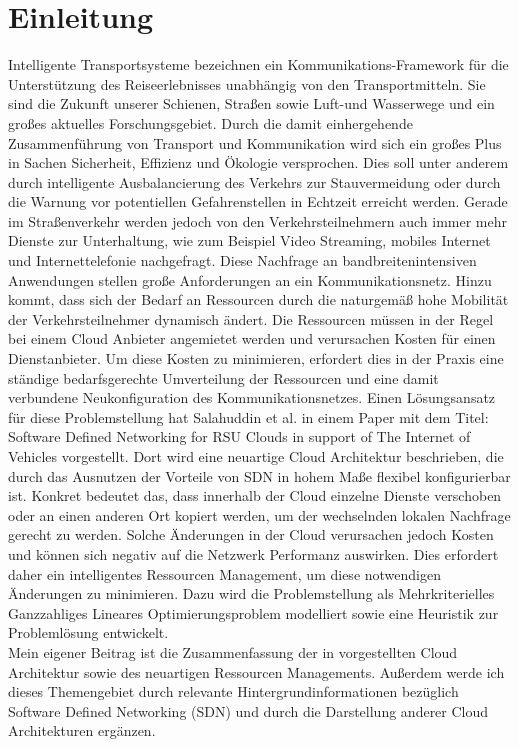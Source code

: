 \documentclass[conference]{IEEEtran}
\begin{document}
\section{Einleitung}

Intelligente Transportsysteme bezeichnen ein Kommunikations-Framework für die Unterstützung des Reiseerlebnisses unabhängig von den Transportmitteln. Sie sind die Zukunft unserer Schienen, Straßen sowie Luft-und Wasserwege und ein großes aktuelles Forschungsgebiet. Durch die damit einhergehende Zusammenführung von Transport und Kommunikation wird sich ein großes Plus in Sachen Sicherheit, Effizienz und Ökologie versprochen. Dies soll unter anderem durch intelligente Ausbalancierung des Verkehrs zur Stauvermeidung oder durch die Warnung vor potentiellen Gefahrenstellen in Echtzeit erreicht werden. Gerade im Straßenverkehr werden jedoch von den Verkehrsteilnehmern auch immer mehr Dienste zur Unterhaltung, wie zum Beispiel Video Streaming, mobiles Internet und Internettelefonie nachgefragt. Diese Nachfrage an bandbreitenintensiven Anwendungen stellen große Anforderungen an ein Kommunikationsnetz. Hinzu kommt, dass sich der Bedarf an Ressourcen durch die naturgemäß hohe Mobilität der Verkehrsteilnehmer dynamisch ändert. Die Ressourcen müssen in der Regel bei einem Cloud Anbieter angemietet werden und verursachen Kosten für einen Dienstanbieter. Um diese Kosten zu minimieren, erfordert dies in der Praxis eine ständige bedarfsgerechte Umverteilung der Ressourcen und eine damit verbundene Neukonfiguration des Kommunikationsnetzes. Einen Lösungsansatz für diese Problemstellung hat Salahuddin et al. in einem Paper \cite{IEEEhowto:orig} mit dem 
Titel: \glqq Software Defined Networking for RSU Clouds in support of The Internet of Vehicles\grqq{} vorgestellt.
Dort wird eine neuartige Cloud Architektur beschrieben, die durch das Ausnutzen der Vorteile von SDN in hohem Maße flexibel konfigurierbar ist. Konkret bedeutet das, dass innerhalb der Cloud einzelne Dienste verschoben oder an einen anderen Ort kopiert werden, um der wechselnden lokalen Nachfrage gerecht zu werden. Solche Änderungen in der Cloud verursachen jedoch Kosten und können sich negativ auf die Netzwerk Performanz auswirken. Dies erfordert daher ein intelligentes Ressourcen Management, um diese notwendigen Änderungen zu minimieren. Dazu wird die Problemstellung als Mehrkriterielles Ganzzahliges Lineares Optimierungsproblem modelliert sowie eine Heuristik zur Problemlösung entwickelt.\\
Mein eigener Beitrag ist die Zusammenfassung der in \cite{IEEEhowto:orig} vorgestellten Cloud Architektur sowie des neuartigen Ressourcen Managements. Außerdem werde ich dieses Themengebiet durch relevante Hintergrundinformationen bezüglich Software Defined Networking (SDN) und durch die Darstellung anderer Cloud Architekturen ergänzen.\\
\end{document}
